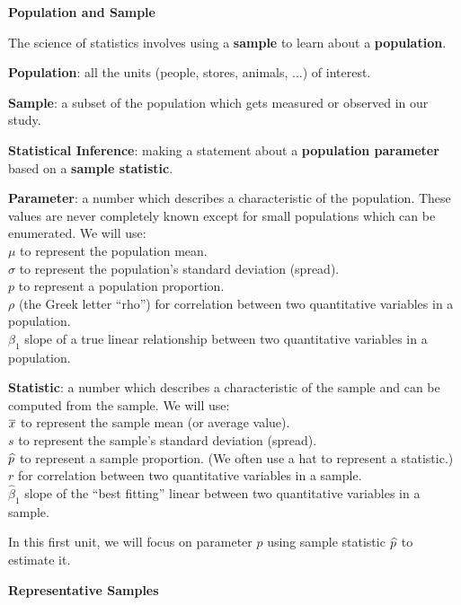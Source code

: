\def\theTopic{Readings 2}

\begin{center}
{\bf {\large Population and Sample}}
\end{center}

The science of statistics involves using a {\bf sample} to learn about
a {\bf population}.

{\bf Population}: all the units (people, stores, animals, ...) of
interest.

{\bf Sample}:  a subset of the population which gets measured or
observed in our study.

{\bf Statistical  Inference}: making a statement about a
{\bf population parameter} based on a {\bf  sample statistic}.

{\bf Parameter}:  a number which describes a characteristic of the
population. These values are never completely known except for small
populations which can be enumerated. We will use:\\
  $\mu$ to represent the population mean.\\
  $\sigma$ to represent the population's standard deviation
  (spread).\\
  $p$  to represent a population proportion.\\
  $\rho$ (the Greek letter ``rho'') for correlation between two
  quantitative variables in a population.\\
  $\beta_1$ slope of a true linear relationship between  two
  quantitative variables in a population.

{\bf Statistic}:  a number which describes a characteristic of the
sample and can be computed from the sample. We will use:\\
  $\overline{x}$ to represent the sample mean (or average value).\\
  $s$  to represent the sample's standard deviation
  (spread).\\
  $\widehat{p}$  to represent a sample proportion.  (We often use a hat to
  represent a statistic.)\\
  $r$  for correlation between two  quantitative variables in a sample.\\
  $\widehat{\beta}_1$ slope of the ``best fitting'' linear  between  two
  quantitative variables in a sample.

In this first unit, we will focus on parameter $p$ using sample
statistic $\widehat{p}$ to estimate it.

\begin{center}
  {\bf Representative Samples}
\end{center}

